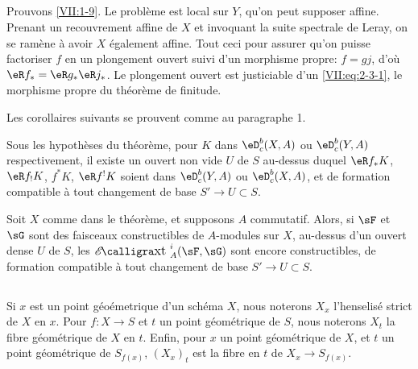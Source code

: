 \subsection{}\label{VII:2-8}

Prouvons \ref{VII:1-9}. Le problème est local sur $Y$, qu'on peut supposer 
affine. Prenant un recouvrement affine de $X$ et invoquant la suite spectrale 
de Leray, on se ramène à avoir $X$ également affine. Tout ceci pour 
assurer qu'on puisse factoriser $f$ en un plongement ouvert suivi d'un 
morphisme propre: $f=g j$, d'où $\eR f_\ast = \eR g_\ast \eR j_\ast$. Le 
plongement ouvert est justiciable d'un \eqref{VII:eq:2-3-1}, le morphisme 
propre du théorème de finitude. 

Les corollaires suivants se prouvent comme au paragraphe 1. 





\begin{corollary_}\label{VII:2-9}
Sous les hypothèses du théorème, pour $K$ dans $\eD_c^b(X,A)$ ou 
$\eD_c^b(Y,A)$ respectivement, il existe un ouvert non vide $U$ de $S$ 
au-dessus duquel $\eR f_\ast K$, $\eR f_! K$, $f^\ast K$, $\eR f^! K$ soient 
dans $\eD_c^b(Y,A)$ ou $\eD_c^b(X,A)$, et de formation compatible à tout 
changement de base $S' \to U\subset S$. 
\end{corollary_}





\begin{corollary_}\label{VII:2-10}
Soit $X$ comme dans le théorème, et supposons $A$ commutatif. Alors, si 
$\sF$ et $\sG$ sont des faisceaux constructibles de $A$-modules sur $X$, 
au-dessus d'un ouvert dense $U$ de $S$, les $\Ext_A^i(\sF,\sG)$ sont encore 
constructibles, de formation compatible à tout changement de base 
$S' \to U\subset S$. 
\end{corollary_}





\subsection{}\label{VII:2-11}

Si $x$ est un point géoémetrique d'un schéma $X$, nous noterons $X_x$ 
l'henselisé strict de $X$ en $x$. Pour $f:X\to S$ et $t$ un point 
géométrique de $S$, nous noterons $X_t$ la fibre géométrique de $X$ en 
$t$. Enfin, pour $x$ un point géométrique de $X$, et $t$ un point 
géométrique de $S_{f(x)}$, $(X_x)_t$ est la fibre en $t$ de 
$X_x \to S_{f(x)}$. 





